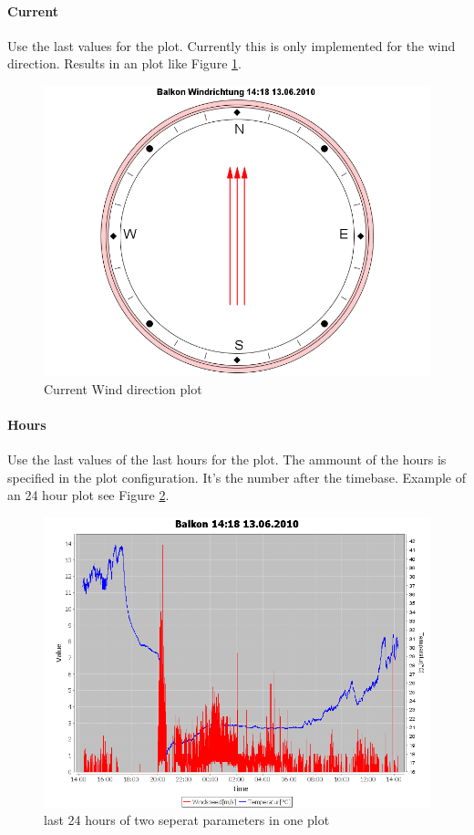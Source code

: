 \paragraph{Current} %
\label{par:current}
Use the last values for the plot. Currently this is only implemented for the wind direction. Results in an plot like Figure \ref{fig:current}.
\begin{figure}[ht]
    \centering
    \includegraphics[width=0.9\linewidth]{master/plot_examplec.png}
    \caption{Current Wind direction plot}
    \label{fig:current}
\end{figure}

\paragraph{Hours} %
\label{par:hours}
Use the last values of the last hours for the plot. The ammount of the hours is specified in the plot configuration. It's the number after the timebase. Example of an 24 hour plot see Figure \ref{fig:hours}.
\begin{figure}[ht]
    \centering
    \includegraphics[width=0.9\linewidth]{master/plot_exampleh.png}
    \caption{last 24 hours of two seperat parameters in one plot}
    \label{fig:hours}
\end{figure}

